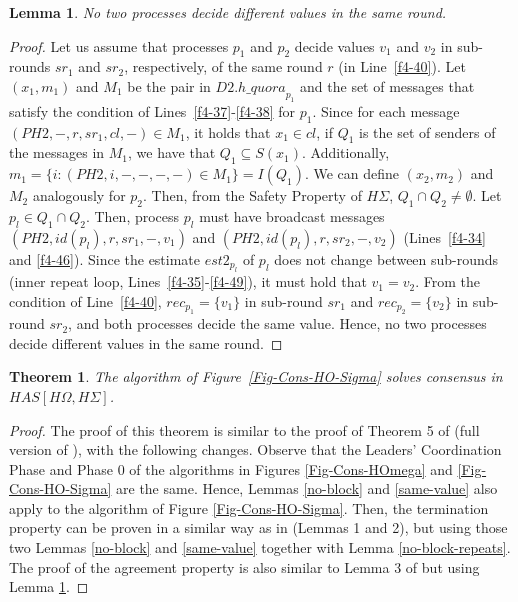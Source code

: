 \documentclass[10pt, conference, compsocconf]{IEEEtran}
\newtheorem{theorem}{Theorem}
\newtheorem{lemma}{Lemma}
\newcommand{\HO}{{H\Omega}}
\newcommand{\HS}{{H\Sigma}}
\newcommand{\quora}{{\mathit{h\_quora}}}
\begin{document}
\begin{lemma}
\label{no-different-dec}
No two processes decide different values in the same round.
\end{lemma}
\begin{proof}
Let us assume that processes $p_1$  and $p_2$ decide values $v_1$ and $v_2$
in sub-rounds  $sr_1$ and  $sr_2$, respectively, of  the same round  $r$ (in
Line~\ref{f4-40}).   Let  $(x_1,   m_1)$   and  $M_1$   be   the  pair   in
$D2.\quora_{p_1}$ and  the set  of messages that  satisfy the  condition of
Lines~\ref{f4-37}-\ref{f4-38} for $p_1$. Since for each message 
$(PH2,-, r, sr_1, cl ,-) \in M_1$,  it holds that $x_1 \in cl$, if $Q_1$ is
the set  of senders of the messages  in $M_1$, we have  that $Q_1 \subseteq
S(x_1)$. Additionally, $m_1=\{i:(PH2,i,-,-,-,-) \in M_1\}=I(Q_1)$. 
We can define $(x_2, m_2)$ and  $M_2$ analogously for $p_2$. Then, from the
Safety Property of $\HS$, $Q_1 \cap  Q_2 \not= \emptyset$. Let $p_l \in Q_1
\cap   Q_2$.   Then,   process   $p_l$   must   have   broadcast   messages
$(PH2,id(p_l),r,sr_1,-,v_1)$        and        $(PH2,id(p_l),r,sr_2,-,v_2)$
(Lines~\ref{f4-34}  and \ref{f4-46}).  Since the  estimate  $est2_{p_l}$ of
$p_l$   does   not   change   between   sub-rounds   (inner   repeat   loop,
Lines~\ref{f4-35}-\ref{f4-49}),  it  must  hold  that $v_1=v_2$.  From  the
condition of  Line~\ref{f4-40}, $rec_{p_1}=\{v_1\}$ in  sub-round $sr_1$ and
$rec_{p_2}=\{v_2\}$ in sub-round $sr_2$,  and both processes decide the same
value. Hence, no two processes decide different values in the same round. 
\end{proof}

 \begin{theorem}
 \label{thm:consensus2}
The  algorithm   of  Figure~\ref{Fig-Cons-HO-Sigma}  solves   consensus  in
 $\mathit{HAS}[\HO,\HS]$. 
\end{theorem}
\begin{proof}
The  proof  of this  theorem  is  similar to  the  proof  of  Theorem 5  of
 \cite{TR-DBLP:conf/wdag/BonnetR10}         (full         version        of
 \cite{DBLP:conf/wdag/BonnetR10}), with the following changes. Observe that
 the Leaders' Coordination Phase and  
 Phase   0  of   the  algorithms   in  Figures   \ref{Fig-Cons-HOmega}  and
 \ref{Fig-Cons-HO-Sigma}  are the  same. Hence,  Lemmas  \ref{no-block} and
 \ref{same-value}    also    apply    to    the   algorithm    of    Figure
 \ref{Fig-Cons-HO-Sigma}.  Then,  
 the  termination  property   can  be  proven  in  a   similar  way  as  in
 \cite{TR-DBLP:conf/wdag/BonnetR10} (Lemmas  1 and 2), but  using those two
 Lemmas   \ref{no-block}   and   \ref{same-value}   together   with   Lemma
 \ref{no-block-repeats}.  The  proof  of  the agreement  property  is  also
 similar to  Lemma 3 of \cite{TR-DBLP:conf/wdag/BonnetR10}  but using Lemma
 \ref{no-different-dec}. 
\end{proof}
\end{document}
